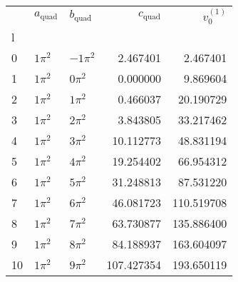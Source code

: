 \begin{tabular}{lllrr}
\toprule
 & $a_{\mathrm{quad}}$ & $b_{\mathrm{quad}}$ & $c_{\mathrm{quad}}$ & $v_0^{(1)}$ \\
l &  &  &  &  \\
\midrule
0 & $1\pi^2$ & $-1\pi^2$ & 2.467401 & 2.467401 \\
1 & $1\pi^2$ & $0\pi^2$ & 0.000000 & 9.869604 \\
2 & $1\pi^2$ & $1\pi^2$ & 0.466037 & 20.190729 \\
3 & $1\pi^2$ & $2\pi^2$ & 3.843805 & 33.217462 \\
4 & $1\pi^2$ & $3\pi^2$ & 10.112773 & 48.831194 \\
5 & $1\pi^2$ & $4\pi^2$ & 19.254402 & 66.954312 \\
6 & $1\pi^2$ & $5\pi^2$ & 31.248813 & 87.531220 \\
7 & $1\pi^2$ & $6\pi^2$ & 46.081723 & 110.519708 \\
8 & $1\pi^2$ & $7\pi^2$ & 63.730877 & 135.886400 \\
9 & $1\pi^2$ & $8\pi^2$ & 84.188937 & 163.604097 \\
10 & $1\pi^2$ & $9\pi^2$ & 107.427354 & 193.650119 \\
\bottomrule
\end{tabular}
